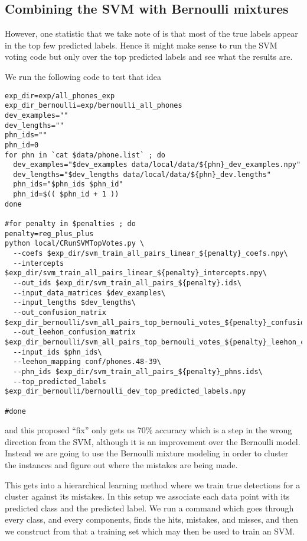 \documentclass{article}
\begin{document}
\subsection{Combining the SVM with Bernoulli mixtures}
However, one statistic that we take note of is that most
of the true labels appear in the top few predicted labels. 
Hence it might make sense to run the SVM voting code but only
over the top predicted labels and see what the results are.

We run the following code to test that idea
\begin{verbatim}
exp_dir=exp/all_phones_exp
exp_dir_bernoulli=exp/bernoulli_all_phones
dev_examples=""
dev_lengths=""
phn_ids=""
phn_id=0
for phn in `cat $data/phone.list` ; do
  dev_examples="$dev_examples data/local/data/${phn}_dev_examples.npy"
  dev_lengths="$dev_lengths data/local/data/${phn}_dev.lengths"
  phn_ids="$phn_ids $phn_id"
  phn_id=$(( $phn_id + 1 ))
done

#for penalty in $penalties ; do
penalty=reg_plus_plus
python local/CRunSVMTopVotes.py \
  --coefs $exp_dir/svm_train_all_pairs_linear_${penalty}_coefs.npy\
  --intercepts $exp_dir/svm_train_all_pairs_linear_${penalty}_intercepts.npy\
  --out_ids $exp_dir/svm_train_all_pairs_${penalty}.ids\
  --input_data_matrices $dev_examples\
  --input_lengths $dev_lengths\
  --out_confusion_matrix $exp_dir_bernoulli/svm_all_pairs_top_bernouli_votes_${penalty}_confusion.npy\
  --out_leehon_confusion_matrix $exp_dir_bernoulli/svm_all_pairs_top_bernouli_votes_${penalty}_leehon_confusion.npy\
  --input_ids $phn_ids\
  --leehon_mapping conf/phones.48-39\
  --phn_ids $exp_dir/svm_train_all_pairs_${penalty}_phns.ids\
  --top_predicted_labels $exp_dir_bernoulli/bernoulli_dev_top_predicted_labels.npy

#done

\end{verbatim}
and this proposed ``fix'' only gets us 70\%
accuracy which is a step in the wrong direction from the SVM, although it is an improvement over the Bernoulli model.
Instead we are going to use the Bernoulli mixture modeling in order
to cluster the instances and figure out where the mistakes are being
made.

This gets into a hierarchical learning method where we train
true detections for a cluster against its mistakes.  In this
setup we associate each data point with its predicted class
and the predicted label.  We run a command which goes through
every class, and every components, finds the hits, mistakes, and
misses, and then we construct from that a training set which
may then be used to train an SVM. 
\end{document}
